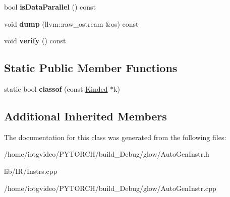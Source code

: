 \begin{DoxyCompactItemize}
\item 
\mbox{\label{classglow_1_1_insert_tensor_inst_ab262fd904b7db96dfc480429a27692bd}} 
bool {\bfseries is\+Data\+Parallel} () const
\item 
\mbox{\label{classglow_1_1_insert_tensor_inst_af2dd49873b880ab1ba2fc023fa735740}} 
void {\bfseries dump} (llvm\+::raw\+\_\+ostream \&os) const
\item 
\mbox{\label{classglow_1_1_insert_tensor_inst_adb151cd23df11678eb1a77b79df53bb6}} 
void {\bfseries verify} () const
\end{DoxyCompactItemize}
\subsection*{Static Public Member Functions}
\begin{DoxyCompactItemize}
\item 
\mbox{\label{classglow_1_1_insert_tensor_inst_a3f552114b9a513f58daf8558368ffa5f}} 
static bool {\bfseries classof} (const \hyperlink{classglow_1_1_kinded}{Kinded} $\ast$k)
\end{DoxyCompactItemize}
\subsection*{Additional Inherited Members}


The documentation for this class was generated from the following files\+:\begin{DoxyCompactItemize}
\item 
/home/iotgvideo/\+P\+Y\+T\+O\+R\+C\+H/build\+\_\+\+Debug/glow/Auto\+Gen\+Instr.\+h\item 
lib/\+I\+R/Instrs.\+cpp\item 
/home/iotgvideo/\+P\+Y\+T\+O\+R\+C\+H/build\+\_\+\+Debug/glow/Auto\+Gen\+Instr.\+cpp\end{DoxyCompactItemize}
